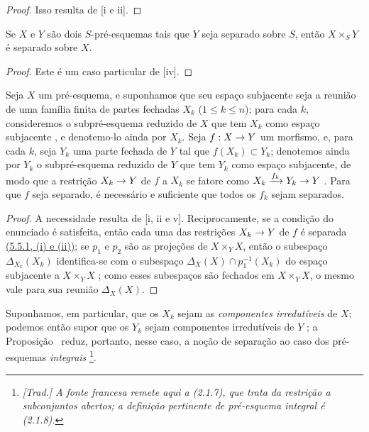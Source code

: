 \documentclass[oneside]{amsart}
\makeatletter
\renewcommand{\leq}{\leqslant}
\newcommand{\ega@arrow}[2]{\mathchoice{#1}{#2}{#2}{#2}}
\renewcommand{\to}{\ega@arrow{\longrightarrow}{\rightarrow}}
\let\EGAOriginalLabel\label
\renewcommand{\label}[1]{\phantomsection\EGAOriginalLabel{#1}}
\makeatother
\begin{document}
\begin{proof}
Isso resulta de [i e ii].
\end{proof}

\begin{corollary}[5.5.3]
\label{I.5.5.3}
Se $X$ e $Y$ são dois $S$-pré-esquemas tais que $Y$ seja separado sobre $S$,
então $X\times_S Y$ é separado sobre $X$.
\end{corollary}

\begin{proof}
Este é um caso particular de [iv].
\end{proof}

\begin{proposition}[5.5.4]
\label{I.5.5.4}
Seja $X$ um pré-esquema, e suponhamos que seu espaço subjacente seja a reunião
de uma família finita de partes fechadas $X_k$ ($1\leq k\leq n$); para cada
$k$, consideremos o subpré-esquema reduzido de $X$ que tem $X_k$ como espaço
subjacente , e denotemo-lo ainda por $X_k$.
Seja $f:X\to Y$ um morfismo, e, para cada $k$, seja $Y_k$ uma parte fechada de
$Y$ tal que $f(X_k)\subset Y_k$; denotemos ainda por $Y_k$ o subpré-esquema
reduzido de $Y$ que tem $Y_k$ como espaço subjacente, de modo que a restrição
$X_k\to Y$ de $f$ a $X_k$ se fatore como
$X_k\xrightarrow{f_k}Y_k\to Y$ .
Para que $f$ seja separado, é necessário e suficiente que todos os $f_k$ sejam
separados.
\end{proposition}

\begin{proof}
A necessidade resulta de [i, ii e v].
Reciprocamente, se a condição do enunciado é satisfeita, então cada uma das
restrições $X_k\to Y$ de $f$ é separada
\hyperref[I.5.5.1]{(5.5.1, (i) e (ii))}; se $p_1$ e $p_2$ são as projeções de
$X\times_Y X$, então o subespaço $\Delta_{X_k}(X_k)$ identifica-se com o
subespaço $\Delta_X(X)\cap p_1^{-1}(X_k)$ do espaço subjacente a
$X\times_Y X$ ; como esses subespaços são fechados em
$X\times_Y X$, o mesmo vale para sua reunião $\Delta_X(X)$.
\end{proof}

Suponhamos, em particular, que os $X_k$ sejam as \emph{componentes
irredutíveis} de $X$; podemos então supor que os $Y_k$ sejam componentes
irredutíveis de $Y$ ; a Proposição~ reduz,
portanto, nesse caso, a noção de separação ao caso dos pré-esquemas
\emph{integrais} \footnote{\emph{[Trad.] A fonte francesa remete
aqui a (2.1.7), que trata da restrição a subconjuntos abertos; a definição
pertinente de pré-esquema integral é (2.1.8).}}.
\end{document}
